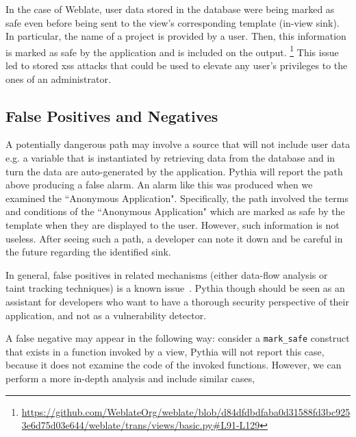 In the case of Weblate,
user data stored in the database
were being marked as safe
even before being sent to the view's corresponding template (in-view sink).
In particular,
the name of a project is provided by a user.
Then,
this information is marked as safe by
the application and is included on
the output. {\footnote{\url{https://github.com/WeblateOrg/weblate/blob/d84dfdbdfaba0d31588fd3bc9253e6d75d03e644/weblate/trans/views/basic.py\#L91-L129}}}
This issue led to stored {\sc xss} attacks
that could be used to elevate any user's privileges to the ones of an administrator.

\subsection{False Positives and Negatives}
\label{sc:fa}

A potentially dangerous path
may involve a source that will
not include user data
e.g. a variable that is instantiated
by retrieving data from the database
and in turn the data are auto-generated
by the application.
Pythia will report the path above
producing a false alarm.
An alarm like this was produced
when we examined the
``Anonymous Application".
Specifically,
the path involved the terms and
conditions of the
``Anonymous Application"
which are marked as safe by
the template when they are
displayed to the user.
However,
such information is not useless.
After seeing such a path,
a developer can note it down and
be careful in the future regarding the
identified sink.

In general,
false positives in related mechanisms
(either data-flow analysis or
taint tracking techniques)
is a known issue~\cite{ME07, MLPK17}.
Pythia though should be seen
as an assistant for developers
who want to have a thorough
security perspective
of their application,
and not as a vulnerability detector.

A false negative may appear in the following
way: consider a {\tt mark\_safe} construct
that exists in a function invoked by a view,
Pythia will not report this case, because
it does not examine the code of the invoked functions.
However, we can perform a more in-depth analysis and
include similar cases, 
